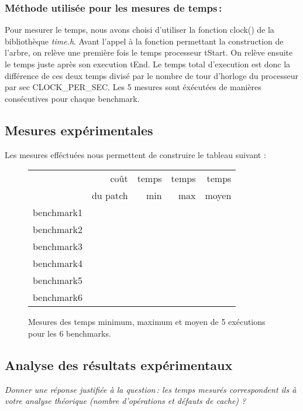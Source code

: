 \documentclass[a4paper, 10pt, french]{article}
\begin{document}
    \subsubsection{Méthode utilisée pour les mesures de temps\,: } 
      Pour mesurer le temps, nous avons choisi d'utiliser la fonction clock() de la bibliothèque {\em time.h}. Avant l'appel à la fonction
      permettant la construction de l'arbre, on relève une première fois le temps processeur tStart.
      On relève ensuite le temps juste après son execution tEnd. 
      Le temps total d'execution est donc la différence de ces deux temps divisé par le nombre de tour d'horloge du processeur par sec CLOCK\_PER\_SEC.
      Les 5 mesures sont éxécutées de manières consécutives pour chaque benchmark. 

  \subsection{Mesures expérimentales}
    Les mesures efféctuées nous permettent de construire le tableau suivant :
    \begin{figure}[h]
      \begin{center}
        \begin{tabular}{|l||r||r|r|r||}
          \hline
          \hline
            & coût         & temps     & temps   & temps \\
            & du patch     & min       & max     & moyen \\
          \hline
          \hline
            benchmark1 &      &     &     &     \\
          \hline
            benchmark2 &      &     &     &     \\
          \hline
            benchmark3 &      &     &     &     \\
          \hline
            benchmark4 &      &     &     &     \\
          \hline
            benchmark5 &      &     &     &     \\
          \hline
            benchmark6 &      &     &     &     \\
          \hline
          \hline
        \end{tabular}
        \caption{Mesures des temps minimum, maximum et moyen de 5 exécutions pour les 6 benchmarks.}
        \label{table-temps}
      \end{center}
    \end{figure}

\subsection{Analyse des résultats expérimentaux}
{\em Donner  une réponse justifiée  à la question\,: 
              les  temps mesurés correspondent ils  à votre analyse théorique (nombre d’opérations et défauts de cache) ?
}
\end{document}
